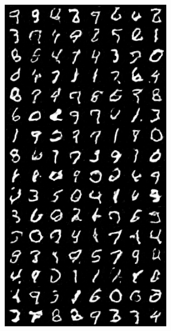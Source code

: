 \begin{figure}[H]
\begin{subfigure}{0.2\textwidth}
        \centering
        \includegraphics[width=0.95\linewidth]{ndf/8/fake_sample_epoch_0010.png}
        \caption{}
        \label{subfig:ndf/8/fake_sample_epoch_0010}
    \end{subfigure}%
    \begin{subfigure}{0.2\textwidth}
        \centering

\end{subfigure}
\end{figure}
